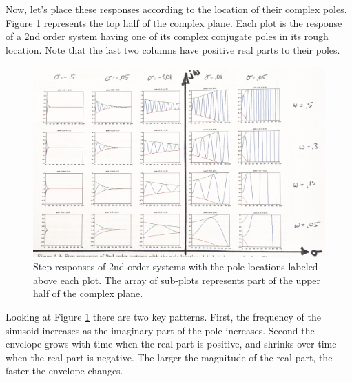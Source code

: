 Now, let's place these responses according to the location of their complex poles.  Figure \ref{splaneresponse} represents the top half of the complex plane.   Each plot is the response of a 2nd order system having one of its complex conjugate poles in its rough location.  Note that the last two columns have positive real parts to their poles.



\begin{figure}\centering
  \includegraphics[width=6.5in]{figs05/s_planeResponses_Annotated.png}
  \caption{Step responses of 2nd order systems with the pole locations labeled above each plot. The array of sub-plots represents part of the upper half of the complex plane.}\label{splaneresponse}
\end{figure}


Looking at Figure \ref{splaneresponse} there are two key patterns.  First, the frequency of the sinusoid increases as the imaginary part of the pole increases.  Second the envelope grows with time when the real part is positive, and shrinks over time when the real part is negative.   The larger the magnitude of the real part, the faster the envelope changes.



